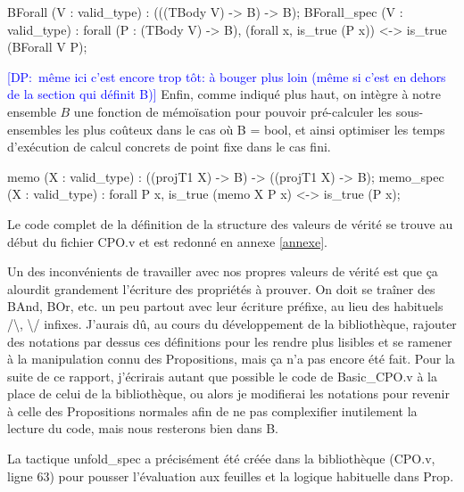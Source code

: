 \documentclass{article}
\newcommand\dam[1]{\textcolor{blue}{{[DP:~#1]}}}
\newcommand\code[1]{{\fontfamily{lmtt}\selectfont #1}}
\theoremstyle{definition}
\begin{document}
\begin{coq}  
  BForall (V : valid_type) : (((TBody V) -> B) -> B);
  BForall_spec (V : valid_type) : forall (P : (TBody V) -> B), 
    (forall x, is_true (P x)) <-> is_true (BForall V P);
\end{coq}


\dam{même ici c'est encore trop tôt: à bouger plus loin (même si c'est en dehors de la section qui définit B)}
Enfin, comme indiqué plus haut, on intègre à notre ensemble $B$ une fonction de mémoïsation pour pouvoir pré-calculer les sous-ensembles les plus coûteux dans le cas où \code{B = bool}, et ainsi optimiser les temps d'exécution de calcul concrets de point fixe dans le cas fini.

\begin{coq}
  memo (X : valid_type) : ((projT1 X) -> B) -> ((projT1 X) -> B);
  memo_spec (X : valid_type) : forall P x, is_true (memo X P x) <-> is_true (P x);
\end{coq}

Le code complet de la définition de la structure des valeurs de vérité se trouve au début du fichier \code{CPO.v} et est redonné en annexe \ref{annexe}.

\medskip

Un des inconvénients de travailler avec nos propres valeurs de vérité est que ça alourdit grandement l'écriture des propriétés à prouver. On doit se traîner des \code{BAnd}, \code{BOr}, etc. un peu partout avec leur écriture préfixe, au lieu des habituels /\textbackslash, \textbackslash / infixes. J'aurais dû, au cours du développement de la bibliothèque, rajouter des notations par dessus ces définitions pour les rendre plus lisibles et se ramener à la manipulation connu des Propositions, mais ça n'a pas encore été fait. Pour la suite de ce rapport, j'écrirais autant que possible le code de \code{Basic\_CPO.v} à la place de celui de la bibliothèque, ou alors je modifierai les notations pour revenir à celle des Propositions normales afin de ne pas complexifier inutilement la lecture du code, mais nous resterons bien dans B.

La tactique \code{unfold\_spec} a précisément été créée dans la bibliothèque (\code{CPO.v}, ligne 63) pour pousser l'évaluation aux feuilles et la logique habituelle dans \code{Prop}.

\end{document}
